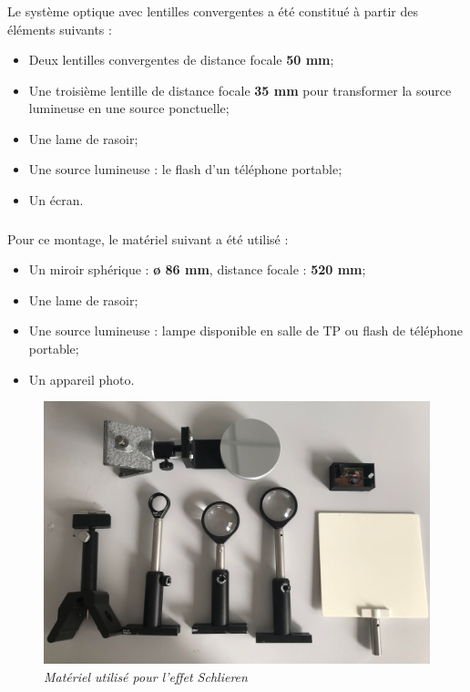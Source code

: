 \subsubsection{\large{}}
Le système optique avec lentilles convergentes a été constitué à partir des éléments suivants :
\begin{itemize}
	\item Deux lentilles convergentes de distance focale \textbf{50 mm};
	\item Une troisième lentille de distance focale \textbf{35 mm} pour transformer la source lumineuse en une source ponctuelle; 
	\item Une lame de rasoir;
	\item Une source lumineuse : le flash d'un téléphone portable;
	\item Un écran.
\end{itemize}
\subsubsection{\large{}}
Pour ce montage, le matériel suivant a été utilisé :
\begin{itemize}
	\item Un miroir sphérique : \textbf{ø 86 mm}, distance focale : \textbf{520 mm};
	\item Une lame de rasoir;
	\item Une source lumineuse : lampe disponible en salle de TP ou flash de téléphone portable;
	\item Un appareil photo.
\end{itemize}
\begin{figure}[H]
	\centering
	\includegraphics[scale = 0.12]{figures/materiel.jpg}
	\caption{\small{\textit{Matériel utilisé pour l'effet Schlieren}}}
	\label{fig:materiel}
\end{figure}
